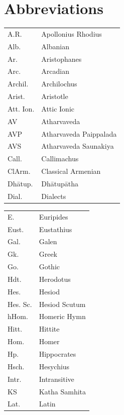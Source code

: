 \documentclass[output=paper,colorlinks,citecolor=brown]{langscibook}
\begin{document}
\section*{Abbreviations}
\begin{tabularx}{.45\textwidth}{lQ}
A.R. & Apollonius Rhodius \\
Alb. & Albanian \\
Ar. & Aristophanes \\
Arc. & Arcadian \\
Archil. & Archilochus \\
Arist. & Aristotle \\
Att. Ion. & Attic Ionic \\
AV & Atharvaveda \\
AVP & Atharvaveda Paippalada \\
AVS & Atharvaveda Saunakiya \\
Call. & Callimachus \\
ClArm. & Classical Armenian \\
Dhātup. & Dhātupātha \\
Dial. & Dialects \\
\end{tabularx}
\begin{tabularx}{.45\textwidth}{lQ}
E. & Euripides \\
Eust. & Eustathius \\
Gal. & Galen \\
Gk. & Greek \\
Go. & Gothic \\
Hdt. & Herodotus \\
Hes. & Hesiod \\
Hes. Sc. & Hesiod Scutum \\
hHom. & Homeric Hymn \\
Hitt. & Hittite \\
Hom. & Homer \\
Hp. & Hippocrates \\
Hsch. & Hesychius\\
Intr. & Intransitive \\
KS & Katha Samhita \\
Lat. & Latin \\
\end{tabularx}
\end{document}
